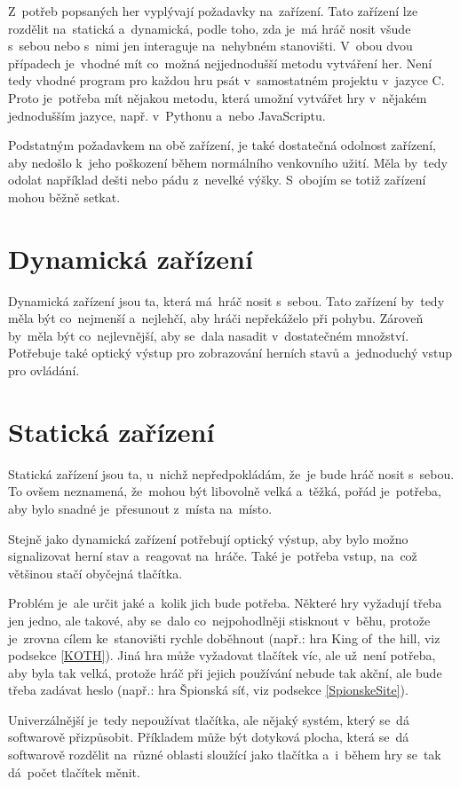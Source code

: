 Z~potřeb popsaných her vyplývají požadavky na~zařízení.
Tato zařízení lze rozdělit na~statická a~dynamická, podle toho, zda je~má hráč nosit všude s~sebou nebo s~nimi jen interaguje na~nehybném stanovišti.
V~obou dvou případech je~vhodné mít co~možná nejjednodušší metodu vytváření her.
Není tedy vhodné program pro každou hru psát v~samostatném projektu v~jazyce C.
Proto je~potřeba mít nějakou metodu, která umožní vytvářet hry v~nějakém jednodušším jazyce, např. v~Pythonu a~nebo JavaScriptu.

Podstatným požadavkem na obě zařízení, je také dostatečná odolnost zařízení, aby nedošlo k~jeho poškození během normálního venkovního užití.
Měla by~tedy odolat například dešti nebo pádu z~nevelké výšky.
S~obojím se totiž zařízení mohou běžně setkat.

\section{Dynamická zařízení}
Dynamická zařízení jsou ta, která má~hráč nosit s~sebou.
Tato zařízení by~tedy měla být co~nejmenší a~nejlehčí, aby hráči nepřekáželo při pohybu.
Zároveň by~měla být co~nejlevnější, aby se~dala nasadit v~dostatečném množství.
Potřebuje také optický výstup pro zobrazování herních stavů a~jednoduchý vstup pro ovládání. 

\section{Statická zařízení}
Statická zařízení jsou ta, u~nichž nepředpokládám, že~je bude hráč nosit s~sebou.
To ovšem neznamená, že~mohou být libovolně velká a~těžká, pořád je~potřeba, aby bylo snadné je~přesunout z~místa na~místo.

Stejně jako dynamická zařízení potřebují optický výstup, aby bylo možno signalizovat herní stav a~reagovat na~hráče.
Také je~potřeba vstup, na~což většinou stačí obyčejná tlačítka.

Problém je~ale určit jaké a~kolik jich bude potřeba.
Některé hry vyžadují třeba jen jedno, ale takové, aby se~dalo co~nejpohodlněji stisknout v~běhu, protože je~zrovna cílem ke~stanovišti rychle doběhnout (např.: hra King of~the hill, viz podsekce \ref{KOTH}).
Jiná hra může vyžadovat tlačítek víc, ale už~není potřeba, aby byla tak velká, protože hráč při jejich používání nebude tak akční, ale bude třeba zadávat heslo (např.:  hra Špionská síť, viz podsekce \ref{SpionskeSite}).

Univerzálnější je~tedy nepoužívat tlačítka, ale nějaký systém, který se~dá softwarově přizpůsobit.
Příkladem může být dotyková plocha, která se~dá softwarově rozdělit na~různé oblasti sloužící jako tlačítka a~i~během hry se~tak dá~počet tlačítek měnit.

